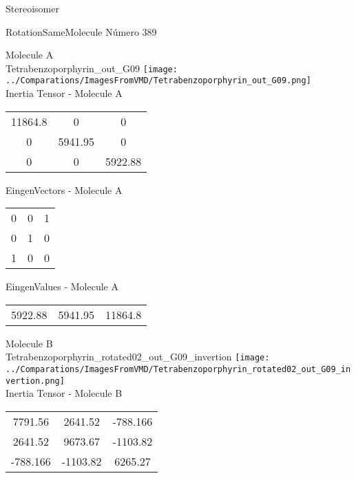 \begin{center}
\vtab
\vtab
\textcolor{NavyBlue}{\Large Stereoisomer}
\end{center}

 \newpage

\vtab[-2cm]
\begin{center}
{\large RotationSameMolecule \tab Número 389}
\end{center}
\begin{multicols}{2}
\begin{center}

Molecule A \\ 
Tetrabenzoporphyrin\_out\_G09
\texttt{[image: ../Comparations/ImagesFromVMD/Tetrabenzoporphyrin\_out\_G09.png]}
\\
Inertia Tensor - Molecule A \\
\vtab

\begin{tabular}{|c c c|}
11864.8	 & 	0	 & 	0	 \\
0	 & 	5941.95	 & 	0	 \\
0	 & 	0	 & 	5922.88
\end{tabular}

\vtab
 EingenVectors - Molecule A     \\
\vtab
\begin{tabular}{|c c c|}
0	 & 	0	 & 	1	 \\
0	 & 	1	 & 	0	 \\
1	 & 	0	 & 	0
\end{tabular}

\vtab
 EingenValues - Molecule A     \\
\vtab
\begin{tabular}{|c c c|}
5922.88	 & 	5941.95	 & 	11864.8	 \\
\end{tabular}
\columnbreak

Molecule B \\ 
Tetrabenzoporphyrin\_rotated02\_out\_G09\_invertion
\texttt{[image: ../Comparations/ImagesFromVMD/Tetrabenzoporphyrin\_rotated02\_out\_G09\_invertion.png]}
\\
Inertia Tensor - Molecule B \\
\vtab

\begin{tabular}{|c c c|}
7791.56	 & 	2641.52	 & 	-788.166	 \\
2641.52	 & 	9673.67	 & 	-1103.82	 \\
-788.166	 & 	-1103.82	 & 	6265.27
\end{tabular}


\end{center}
\end{multicols}
